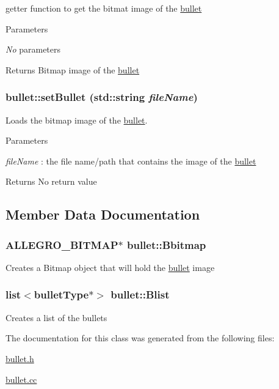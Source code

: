 getter function to get the bitmat image of the \hyperlink{classbullet}{bullet} 
\begin{DoxyParams}{Parameters}
\item[{\em No}]parameters \end{DoxyParams}
\begin{DoxyReturn}{Returns}
Bitmap image of the \hyperlink{classbullet}{bullet} 
\end{DoxyReturn}
\hypertarget{classbullet_a32b293b38ec5efd19c86c5cc95ab0e25}{
\subsubsection[{setBullet}]{\setlength{\rightskip}{0pt plus 5cm}bullet::setBullet (std::string {\em fileName})}}
\label{classbullet_a32b293b38ec5efd19c86c5cc95ab0e25}


Loads the bitmap image of the \hyperlink{classbullet}{bullet}. 
\begin{DoxyParams}{Parameters}
\item[{\em fileName}]: the file name/path that contains the image of the \hyperlink{classbullet}{bullet} \end{DoxyParams}
\begin{DoxyReturn}{Returns}
No return value 
\end{DoxyReturn}


\subsection{Member Data Documentation}
\hypertarget{classbullet_ae5e6772fcf149f67b495de01c350d83f}{
\subsubsection[{Bbitmap}]{\setlength{\rightskip}{0pt plus 5cm}ALLEGRO\_\-BITMAP$\ast$ {\bf bullet::Bbitmap}}}
\label{classbullet_ae5e6772fcf149f67b495de01c350d83f}
Creates a Bitmap object that will hold the \hyperlink{classbullet}{bullet} image \hypertarget{classbullet_ae700876dfc6875705a5c40ff4b80f94d}{
\subsubsection[{Blist}]{\setlength{\rightskip}{0pt plus 5cm}list$<${\bf bulletType}$\ast$$>$ {\bf bullet::Blist}}}
\label{classbullet_ae700876dfc6875705a5c40ff4b80f94d}
Creates a list of the bullets 

The documentation for this class was generated from the following files:\begin{DoxyCompactItemize}
\item 
\hyperlink{bullet_8h}{bullet.h}\item 
\hyperlink{bullet_8cc}{bullet.cc}\end{DoxyCompactItemize}

